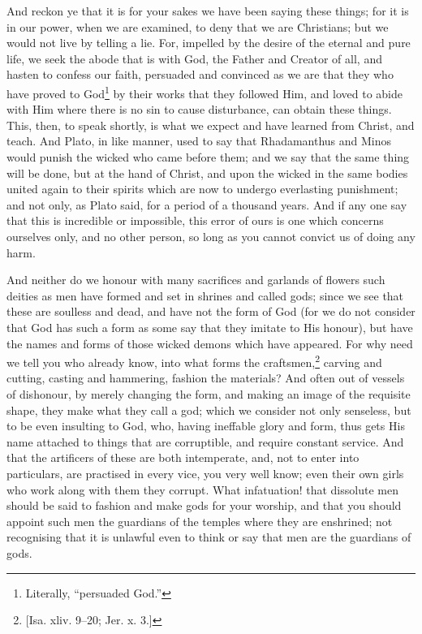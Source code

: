 
And reckon ye that it is for your sakes we have been saying these things; for it is in our power, when we are examined, to deny that we are Christians; but we would not live by telling a lie. For, impelled by the desire of the eternal and pure life, we seek the abode that is with God, the Father and Creator of all, and hasten to confess our faith, persuaded and convinced as we are that they who have proved to God\footnote{Literally, “persuaded God.”} by their works that they followed Him, and loved to abide with Him where there is no sin to cause disturbance, can obtain these things. This, then, to speak shortly, is what we expect and have learned from Christ, and teach. And Plato, in like manner, used to say that Rhadamanthus and Minos would punish the wicked who came before them; and we say that the same thing will be done, but at the hand of Christ, and upon the wicked in the same bodies united again to their spirits which are now to undergo everlasting punishment; and not only, as Plato said, for a period of a thousand years. And if any one say that this is incredible or impossible, this error of ours is one which concerns ourselves only, and no other person, so long as you cannot convict us of doing any harm.


And neither do we honour with many sacrifices and garlands of flowers such deities as men have formed and set in shrines and called gods; since we see that these are soulless and dead, and have not the form of God (for we do not consider that God has such a form as some say that they imitate to His honour), but have the names and forms of those wicked demons which have appeared. For why need we tell you who already know, into what forms the craftsmen,\footnote{[Isa. xliv. 9–20; Jer. x. 3.]} carving and cutting, casting and hammering, fashion the materials? And often out of vessels of dishonour, by merely changing the form, and making an image of the requisite shape, they make what they call a god; which we consider not only senseless, but to be even insulting to God, who, having ineffable glory and form, thus gets His name attached to things that are corruptible, and require constant service. And that the artificers of these are both intemperate, and, not to enter into particulars, are practised in every vice, you very well know; even their own girls who work along with them they corrupt. What infatuation! that dissolute men should be said to fashion and make gods for your worship, and that you should appoint such men the guardians of the temples where they are enshrined; not recognising that it is unlawful even to think or say that men are the guardians of gods.

